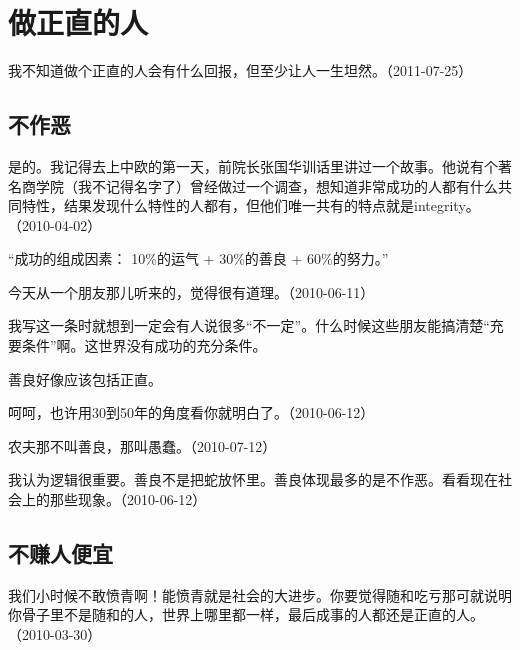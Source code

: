 
\section{做正直的人}

我不知道做个正直的人会有什么回报，但至少让人一生坦然。（2011-07-25）

\subsection{不作恶}


是的。我记得去上中欧的第一天，前院长张国华训话里讲过一个故事。他说有个著名商学院（我不记得名字了）曾经做过一个调查，想知道非常成功的人都有什么共同特性，结果发现什么特性的人都有，但他们唯一共有的特点就是integrity。（2010-04-02）

“成功的组成因素： 10\%的运气 + 30\%的善良 + 60\%的努力。”

今天从一个朋友那儿听来的，觉得很有道理。（2010-06-11）


我写这一条时就想到一定会有人说很多“不一定”。什么时候这些朋友能搞清楚“充要条件”啊。这世界没有成功的充分条件。


善良好像应该包括正直。


呵呵，也许用30到50年的角度看你就明白了。（2010-06-12）


农夫那不叫善良，那叫愚蠢。（2010-07-12）

我认为逻辑很重要。善良不是把蛇放怀里。善良体现最多的是不作恶。看看现在社会上的那些现象。（2010-06-12）

\subsection{不赚人便宜}


我们小时候不敢愤青啊！能愤青就是社会的大进步。你要觉得随和吃亏那可就说明你骨子里不是随和的人，世界上哪里都一样，最后成事的人都还是正直的人。（2010-03-30）

